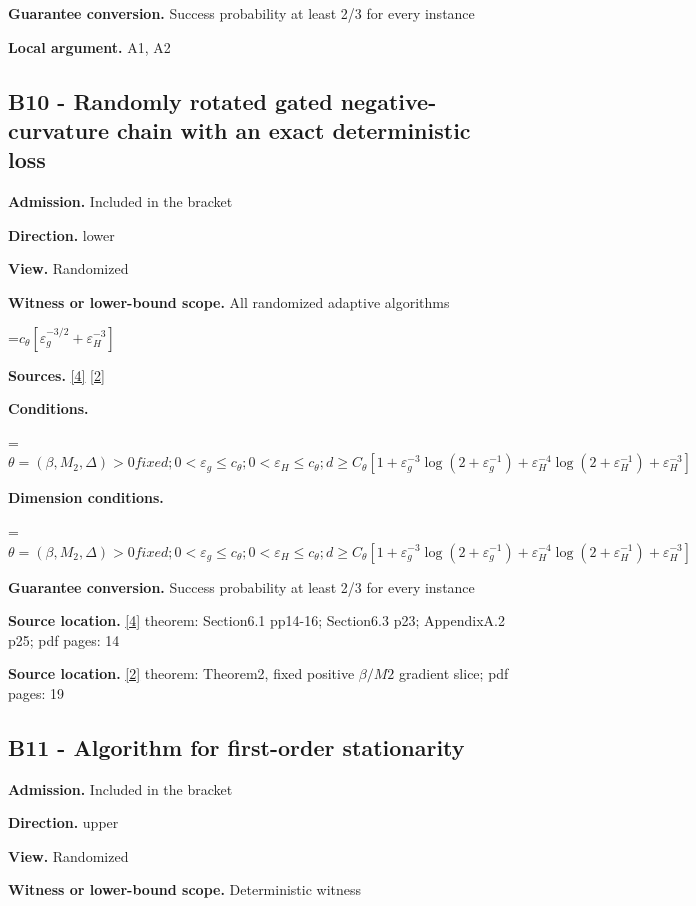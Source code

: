 \documentclass[10pt,a4paper]{article}
\newcommand{\AtlasMath}[1]{\par\begingroup\centering\setbox0=\hbox{$\displaystyle #1$}\ifdim\wd0>1.4\linewidth\typeout{ATLAS WIDE FORMULA: \the\wd0}\fi\ifdim\wd0>\linewidth\resizebox{\linewidth}{!}{\box0}\else\box0\fi\par\endgroup}
\begin{document}
\textbf{Guarantee conversion.} Success probability at least 2/3 for every instance

\textbf{Local argument.} A1, A2

\subsection{B10 - Randomly rotated gated negative-curvature chain with an exact deterministic loss}
\textbf{Admission.} Included in the bracket

\textbf{Direction.} lower

\textbf{View.} Randomized

\textbf{Witness or lower-bound scope.} All randomized adaptive algorithms

\AtlasMath{c_\theta[\varepsilon_g^{-3/2}+\varepsilon_H^{-3}]}
\textbf{Sources.} \href{https://arxiv.org/abs/2610.16832}{[4]} \href{https://arxiv.org/abs/1710.11606}{[2]}

\textbf{Conditions.} 
\AtlasMath{\theta=(\beta,M_2,\Delta)>0 fixed;0<\varepsilon_g\le c_\theta;0<\varepsilon_H\le c_\theta;d\ge C_\theta[1+\varepsilon_g^{-3}\log(2+\varepsilon_g^{-1})+\varepsilon_H^{-4}\log(2+\varepsilon_H^{-1})+\varepsilon_H^{-3}]}


\textbf{Dimension conditions.} 
\AtlasMath{\theta=(\beta,M_2,\Delta)>0 fixed;0<\varepsilon_g\le c_\theta;0<\varepsilon_H\le c_\theta;d\ge C_\theta[1+\varepsilon_g^{-3}\log(2+\varepsilon_g^{-1})+\varepsilon_H^{-4}\log(2+\varepsilon_H^{-1})+\varepsilon_H^{-3}]}


\textbf{Guarantee conversion.} Success probability at least 2/3 for every instance

\textbf{Source location.} \href{https://arxiv.org/abs/2610.16832}{[4]} theorem: Section6.1 pp14-16; Section6.3 p23; AppendixA.2 p25; pdf pages: 14

\textbf{Source location.} \href{https://arxiv.org/abs/1710.11606}{[2]} theorem: Theorem2, fixed positive $\beta /M2$ gradient slice; pdf pages: 19

\subsection{B11 - Algorithm for first-order stationarity}
\textbf{Admission.} Included in the bracket

\textbf{Direction.} upper

\textbf{View.} Randomized

\textbf{Witness or lower-bound scope.} Deterministic witness
\end{document}
